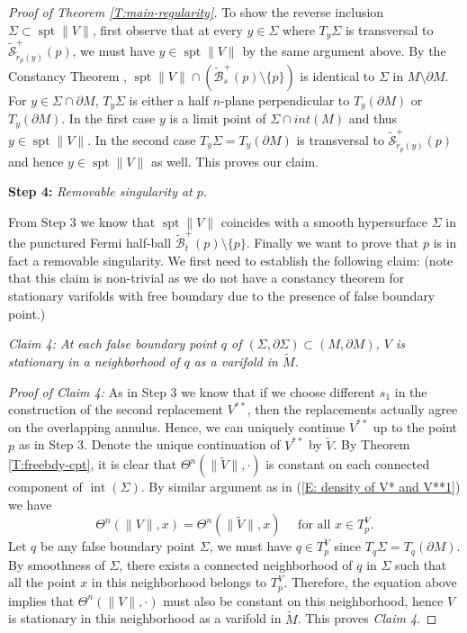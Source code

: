 \documentclass[10pt]{amsart}
\theoremstyle{definition}
\theoremstyle{remark}
\numberwithin{equation}{section}
\newcommand{\Si}{\Sigma}
\newcommand{\tM}{\widetilde{M}}
\newcommand{\tBcal}{\widetilde{\mathcal{B}}}
\newcommand{\tScal}{\widetilde{\mathcal{S}}}
\newcommand{\tir}{\widetilde{r}}
\newcommand{\spt}{\operatorname{spt}}
\newcommand{\interior}{\operatorname{int}}
\begin{document}
\begin{proof}[Proof of Theorem \ref{T:main-regularity}]
To show the reverse inclusion $\Si\subset \spt\|V\|$, first observe that at every $y\in \Sigma$ where $T_y\Sigma$ is transversal to $\tScal^+_{\tir_p(y)}(p)$, we must have $y\in \spt\|V\|$ by the same argument above.
By the Constancy Theorem \cite[41.1]{Simon}, $\spt\|V\|\cap (\tBcal^+_s(p) \setminus \{p\})$ is identical to $\Si$ in $M \setminus \partial M$. For $y\in \Sigma\cap \partial M$, $T_y\Sigma$ is either a half $n$-plane perpendicular to $T_y(\partial M)$ or $T_y(\partial M)$. In the first case $y$ is a limit point of $\Si \cap int(M)$ and thus $y\in \spt\|V\|$. In the second case $T_y\Sigma=T_y(\partial M)$ is transversal to $\tScal^+_{\tir_p(y)}(p)$ and hence $y\in \spt\|V\|$ as well. This proves our claim.


\vspace{.3cm}

\noindent \textbf{Step 4:} \textit{Removable singularity at $p$.}

\vspace{.3cm}

From Step 3 we know that $\spt\|V\|$ coincides with a smooth hypersurface $\Sigma$ in the punctured Fermi half-ball $\tBcal^+_t(p) \setminus \{p\}$. Finally we want to prove that $p$ is in fact a removable singularity. We first need to establish the following claim: (note that this claim is non-trivial as we do not have a constancy theorem for stationary varifolds with free boundary due to the presence of false boundary point.)

\vspace{.3cm}

\textit{Claim 4: At each false boundary point $q$ of $(\Sigma,\partial \Sigma) \subset (M,\partial M)$, $V$ is stationary in a neighborhood of $q$ as a varifold in $\tM$.}

\vspace{.3cm}

\textit{Proof of Claim 4:} 
As in Step 3 we know that if we choose different $s_1$ in the construction of the second replacement $V^{**}$, then the replacements actually agree on the overlapping annulus. Hence, we can uniquely continue $V^{**}$ up to the point $p$ as in Step 3. Denote the unique continuation of $V^{**}$ by $\tilde{V}$. By Theorem \ref{T:freebdy-cpt}, it is clear that $\Theta^n(\|\tilde{V}\|,\cdot)$ is constant on each connected component of $\interior(\Sigma)$. By similar argument as in (\ref{E: density of V* and V**1}) we have
\[ \Theta^n(\|V\|,x)=\Theta^n(\|\tilde{V}\|,x) \quad \text{ for all $x \in T^V_p$}.\]
Let $q$ be any false boundary point $\Sigma$, we must have $q \in T^V_p$ since $T_q \Sigma=T_q (\partial M)$. By smoothness of $\Sigma$, there exists a connected neighborhood of $q$ in $\Sigma$ such that all the point $x$ in this neighborhood belongs to $T_p^V$. Therefore, the equation above implies that $\Theta^n(\|V\|,\cdot)$ must also be constant on this neighborhood, hence $V$ is stationary in this neighborhood as a varifold in $\tM$.
This proves \emph{Claim 4}.


\end{proof}
\end{document}
